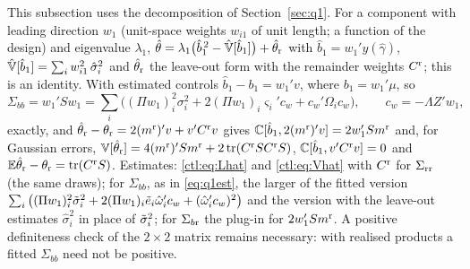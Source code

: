 This subsection uses the decomposition of Section~\ref{sec:q1}. For a component with leading direction $w_1$
(unit-space weights $w_{i1}$ of unit length; a function of the design) and eigenvalue $\lambda_1$,
$\hat\theta=\lambda_1\big(\hat b_1^{\,2}-\hat{\mathbb{V}}[\hat b_1]\big)+\hat\theta_{\rm r}$ with $\hat b_1=w_1'y(\hat\gamma)$,
$\hat{\mathbb{V}}[\hat b_1]=\sum_iw_{i1}^2\,\hat\sigma_i^2$ and $\hat\theta_{\rm r}$ the leave-out form with the remainder
weights $C^{\rm r}$; this is an identity. With estimated controls $\hat b_1-b_1=w_1'v$, where $b_1=w_1'\mu$, so
\[
 \Sigma_{bb}=w_1'Sw_1=\sum_i\bigl((\Pi w_1)_i^2\sigma_i^2+2(\Pi w_1)_i\varsigma_i'c_w+c_w'\Omega_ic_w\bigr),\qquad
 c_w=-\Lambda Z'w_1,
\]
exactly, and $\hat\theta_{\rm r}-\theta_{\rm r}=2(m^{\rm r})'v+v'C^{\rm r}v$ gives
$\mathbb{C}[\hat b_1,2(m^{\rm r})'v]=2w_1'Sm^{\rm r}$ and, for Gaussian errors,
$\mathbb{V}[\hat\theta_{\rm r}]=4(m^{\rm r})'Sm^{\rm r}+2\operatorname{tr}(C^{\rm r}SC^{\rm r}S)$, $\mathbb{C}[\hat b_1,v'C^{\rm r}v]=0$ and
$\mathbb{E}\hat\theta_{\rm r}-\theta_{\rm r}=\operatorname{tr}(C^{\rm r}S)$. Estimates: \eqref{ctl:eq:Lhat} and \eqref{ctl:eq:Vhat} with
$C^{\rm r}$ for $\Sigma_{\rm rr}$ (the same draws); for $\Sigma_{bb}$, as in \eqref{eq:q1est}, the larger of the fitted
version $\sum_i\big((\Pi w_1)_i^2\tilde\sigma_i^2+2(\Pi w_1)_i\tilde e_i\hat\omega_i'c_w+(\hat\omega_i'c_w)^2\big)$ and the version
with the leave-out estimates $\hat\sigma_i^2$ in place of $\tilde\sigma_i^2$; for $\Sigma_{b{\rm r}}$ the plug-in for
$2w_1'Sm^{\rm r}$. A positive definiteness check of the $2\times2$ matrix remains necessary: with realised products a
fitted $\Sigma_{bb}$ need not be positive.

